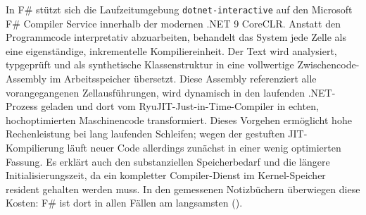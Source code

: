 In F\# stützt sich die Laufzeitumgebung \texttt{dotnet-interactive} auf den Microsoft F\# Compiler Service innerhalb der modernen .NET 9 CoreCLR.
Anstatt den Programmcode interpretativ abzuarbeiten, behandelt das System jede Zelle als eine eigenständige, inkrementelle Kompiliereinheit.
Der Text wird analysiert, typgeprüft und als synthetische Klassenstruktur in eine vollwertige Zwischencode-Assembly im Arbeitsspeicher übersetzt.
Diese Assembly referenziert alle vorangegangenen Zellausführungen, wird dynamisch in den laufenden .NET-Prozess geladen und dort vom RyuJIT-Just-in-Time-Compiler in echten, hochoptimierten Maschinencode transformiert.
Dieses Vorgehen ermöglicht hohe Rechenleistung bei lang laufenden Schleifen; wegen der gestuften JIT-Kompilierung läuft neuer Code allerdings zunächst in einer wenig optimierten Fassung.
Es erklärt auch den substanziellen Speicherbedarf und die längere Initialisierungszeit, da ein kompletter Compiler-Dienst im Kernel-Speicher resident gehalten werden muss.
In den gemessenen Notizbüchern überwiegen diese Kosten: F\# ist dort in allen Fällen am langsamsten ().

